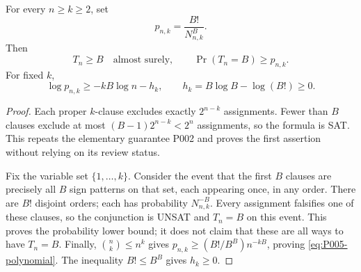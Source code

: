\begin{proposition}
\label{prop:P005-early-core}
For every $n\ge k\ge2$, set
\[
 p_{n,k}=\frac{B!}{N_{n,k}^{B}}.
\]
Then
\begin{equation}
 T_n\ge B\quad\text{almost surely},\qquad
 \Pr(T_n=B)\ge p_{n,k}.
 \label{eq:P005-early-core}
\end{equation}
For fixed $k$,
\begin{equation}
 \log p_{n,k}\ge-kB\log n-h_k,
 \qquad h_k=B\log B-\log(B!)\ge0.
 \label{eq:P005-polynomial}
\end{equation}
\end{proposition}
\begin{proof}
Each proper $k$-clause excludes exactly $2^{n-k}$ assignments. Fewer
than $B$ clauses exclude at most $(B-1)2^{n-k}<2^n$ assignments,
so the formula is SAT. This repeats the elementary guarantee P002
and proves the first assertion without relying on its review status.

Fix the variable set $\{1,\ldots,k\}$. Consider the event that the
first $B$ clauses are precisely all $B$ sign patterns on that set,
each appearing once, in any order. There are $B!$ disjoint orders;
each has probability $N_{n,k}^{-B}$. Every assignment falsifies
one of these clauses, so the conjunction is UNSAT and $T_n=B$
on this event. This proves the probability lower bound; it does not
claim that these are all ways to have $T_n=B$.
Finally, $\binom nk\le n^k$ gives
$p_{n,k}\ge (B!/B^B)n^{-kB}$, proving
\eqref{eq:P005-polynomial}. The inequality $B!\le B^B$ gives $h_k\ge0$.
\end{proof}

